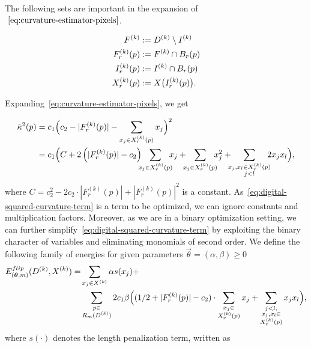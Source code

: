 The following sets are important in the expansion of $~\cref{eq:curvature-estimator-pixels}$.


\begin{align*}
	F^{(k)} &:= D^{(k)} \setminus I^{(k)} \\
	F_r^{(k)}(p) &:= F^{(k)} \cap B_r(p)\\
	I_r^{(k)}(p) &:= I^{(k)} \cap B_r(p) \\
	X_r^{(k)}(p) &:= X\big( I_r^{(k)}(p) \big). \\
\end{align*}


Expanding~\cref{eq:curvature-estimator-pixels}, we get 

\begin{align}
  \hat{\kappa}^2(p) &= c_1\Big( c_2 - |F_{r}^{(k)}(p)| - \sum_{x_j \in X_r^{(k)}(p)} {x_j} \Big)^2 \nonumber \\
   &= c_1 \Big( C + 2\left( |F_{r}^{(k)}(p)| - c_2 \right) \hspace{-2mm}\sum_{x_j \in X_{r}^{(k)}(p)}\hspace{-2mm}{x_j} + \hspace{-2mm}\sum_{x_j \in X_{r}^{(k)}(p)}\hspace{-2mm}{x_j^2} + \hspace{-2mm}\sum_{ \substack{x_j,x_l \in X_{r}^{(k)}(p) \\ j<l} }\hspace{-2mm}{2x_jx_l}  \Big),
   \label{eq:digital-squared-curvature-term}
\end{align}
where $C=c_2^2 - 2c_2 \cdot |F_{r}^{(k)}(p)| + |F_{r}^{(k)}(p)|^2$ is a constant. As~\cref{eq:digital-squared-curvature-term} is a term to be optimized, we can ignore constants and multiplication factors. Moreover, as we are in a binary optimization setting, we can  further simplify~\cref{eq:digital-squared-curvature-term} by exploiting the binary character of variables and eliminating monomials of second order. We define the following family
of energies for given parameters $\vec{\theta}=(\alpha,\beta ) \geq 0$
\begin{align}
  E_{(\bm{\theta},m)}^{flip}(D^{(k)},X^{(k)}) =& \sum_{x_j \in X^{(k)}}{\alpha s(x_j)} + \nonumber \\ 
  & \sum_{ \substack{p \in \\ R_m(D^{(k)})}}{ 2c_1 \beta  \Big( { (1/2+ |F_{r}^{(k)}(p)|-c_2) \cdot \sum_{ \substack{ x_j \in \\ X_{r}^{(k)}(p)}}{x_j} } + \sum_{ \substack{j<l, \\ x_j,x_l \in \\ X_{r}^{(k)}(p) } }{x_jx_l} \Big) },
  \label{eq:energy-family}
\end{align}
where $s(\cdot)$ denotes the length penalization term, written as

